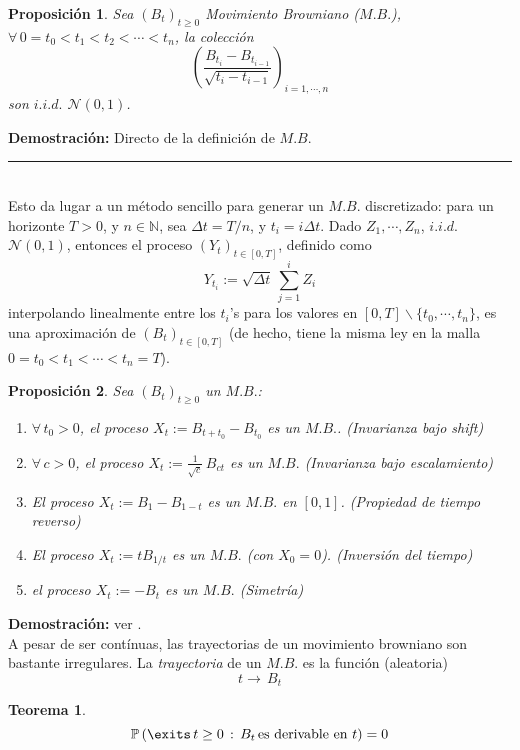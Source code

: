 \documentclass[a4paper]{article}
\newcommand{\prob}{\mathbb{P}}
\newtheorem{teorema}{Teorema}
\newtheorem{prop}{Proposici\'on}
\numberwithin{equation}{subsection}
\def\N{\mathbb N}
\begin{document}
\begin{prop}Sea $(B_t)_{t\geq 0}$ Movimiento Browniano ($M.B.$), $\forall\, 0=t_0<t_1<t_2<\cdots<t_n$, la colección
\[\left(\frac{B_{t_i}-B_{t_{i-1}}}{\sqrt{t_i-t_{i-1}}}\right)_{i=1,\cdots,n}\]
son $i.i.d.$ $\mathcal{N}(0,1)$.
\end{prop}
\textbf{Demostración: }Directo de la definición de $M.B$.\\\rule{0.7em}{0.7em}\\ \newline
Esto da lugar  a un método sencillo para generar un $M.B.$ discretizado: para un horizonte $T>0$, y $n\in\N$, sea $\Delta t = T/n$, y $t_i = i\Delta t$. Dado $Z_1,\cdots, Z_n$,  $i.i.d.$ $\mathcal{N}(0,1)$, entonces el proceso $(Y_t)_{t\in [0,T]}$, definido como 
\[Y_{t_i}:= \sqrt{\Delta t}\,\sum_{j=1}^i Z_i\]
interpolando linealmente entre los $t_i$'s para los valores en $[0,T]\backslash\{t_0,\cdots,t_n\}$, es una aproximación de $(B_t)_{t\in[0,T]}$ (de hecho, tiene la misma ley en la malla $0=t_0<t_1<\cdots<t_n=T$).

\begin{prop} Sea $(B_t)_{t\geq 0}$ un $M.B.$:
\begin{enumerate}
    \item[a.] $\forall\,t_0>0$, el proceso $X_t := B_{t+t_0}-B_{t_0}$ es un $M.B.$. (Invarianza bajo shift)
    \item[b.] $\forall\,c>0$, el proceso $X_t := \frac{1}{\sqrt{c}}\,B_{ct}$ es un $M.B.$ (Invarianza bajo escalamiento)
    \item[c.] El proceso $X_t := B_1 - B_{1-t}$ es un $M.B.$ en $[0,1]$. (Propiedad de tiempo reverso)
    \item[d.]  El proceso $X_t:=tB_{1/t}$ es un $M.B.$ (con $X_0 =0$). (Inversión del tiempo)
    \item[e.] el proceso $X_t:=-B_t$ es un $M.B.$ (Simetría)
\end{enumerate}
\end{prop}
\textbf{Demostración: }ver \cite[cap. 2]{Kara}.\\ \newline
A pesar de ser contínuas, las trayectorias de un movimiento browniano son bastante irregulares. La \textit{trayectoria} de un $M.B.$ es la función (aleatoria)
\[t\rightarrow\,B_t\]
\begin{teorema}
\[\prob\left(\exits\,t\geq 0\,:\,B_t\,\text{es derivable en }t\right) = 0\]
\end{teorema}
\end{document}
